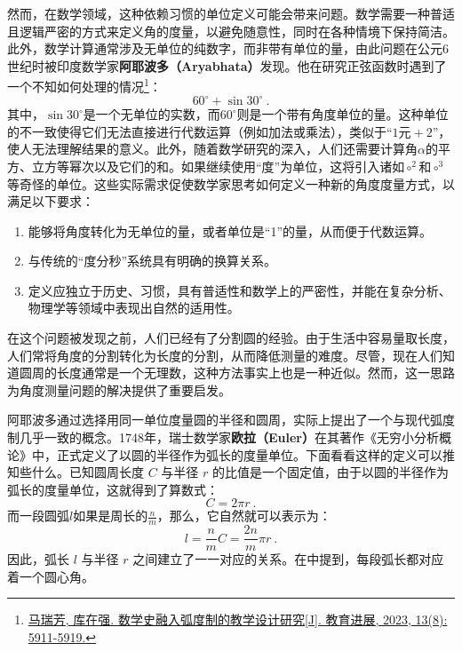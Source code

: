 然而，在数学领域，这种依赖习惯的单位定义可能会带来问题。数学需要一种普适且逻辑严密的方式来定义角的度量，以避免随意性，同时在各种情境下保持简洁。此外，数学计算通常涉及无单位的纯数字，而非带有单位的量，由此问题在公元6世纪时被印度数学家\textbf{阿耶波多（Aryabhata）}发现。他在研究正弦函数时遇到了一个不知如何处理的情况\footnote{\href{https://www.hanspub.org/journal/PaperInformation?paperID=71063&utm_source=chatgpt.com}{马瑞芳, 库在强. 数学史融入弧度制的教学设计研究[J]. 教育进展, 2023, 13(8): 5911-5919.}}：
\begin{equation}
60^\circ+\sin30^\circ~.
\end{equation}
其中，$\sin 30^\circ$是一个无单位的实数，而$60^\circ$则是一个带有角度单位的量。这种单位的不一致使得它们无法直接进行代数运算（例如加法或乘法），类似于“$1\text{元} + 2$”，使人无法理解结果的意义。此外，随着数学研究的深入，人们还需要计算角$\alpha$的平方、立方等幂次以及它们的和。如果继续使用“度”为单位，这将引入诸如$\circ^2$和$\circ^3$等奇怪的单位。这些实际需求促使数学家思考如何定义一种新的角度度量方式，以满足以下要求：
\begin{enumerate}
\item 能够将角度转化为无单位的量，或者单位是“1”的量，从而便于代数运算。
\item 与传统的“度分秒”系统具有明确的换算关系。
\item 定义应独立于历史、习惯，具有普适性和数学上的严密性，并能在复杂分析、物理学等领域中表现出自然的适用性。
\end{enumerate}

在这个问题被发现之前，人们已经有了分割圆的经验。由于生活中容易量取长度，人们常将角度的分割转化为长度的分割，从而降低测量的难度。尽管，现在人们知道圆周的长度通常是一个无理数，这种方法事实上也是一种近似。然而，这一思路为角度测量问题的解决提供了重要启发。

阿耶波多通过选择用同一单位度量圆的半径和圆周，实际上提出了一个与现代弧度制几乎一致的概念。1748年，瑞士数学家\textbf{欧拉（Euler）}在其著作《无穷小分析概论》中，正式定义了以圆的半径作为弧长的度量单位。下面看看这样的定义可以推知些什么。已知圆周长度 $C$ 与半径 $r$ 的比值是一个固定值，由于以圆的半径作为弧长的度量单位，这就得到了算数式：
\begin{equation}
C=2\pi r~.
\end{equation}
而一段圆弧$l$如果是周长的$\displaystyle\frac{n}{m}$，那么，它自然就可以表示为：
\begin{equation}
l=\frac{n}{m}C=\frac{2n}{m}\pi r~.
\end{equation}
因此，弧长 $l$ 与半径 $r$ 之间建立了一一对应的关系。在中提到，每段弧长都对应着一个圆心角。

